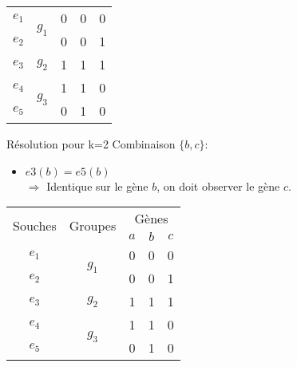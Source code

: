 \begin{overprint}
{\begin{minipage}[l]{0.46\linewidth}
\begin{center}
\begin{tabular}{|c||c|c|c|c|}
						\hline
						\hline
						$e_1$&\multirow{2}{*}{$g_1$}& 0 & 0 & 0\\
						\cline{1-1} \cline{3-5}
						$e_2$&& 0 & 0 & 1\\
						\hline
						\hline
						$e_3$&$g_2$& 1 & \cellcolor{cyan}1 & 1\\
						\hline
						\hline
						$e_4$&\multirow{2}{*}{$g_3$}& 1 & 1 & 0\\
						\cline{1-1} \cline{3-5}
						$e_5$&& 0 & \cellcolor{cyan}1 & 0\\
						\hline
					\end{tabular}
				\end{center}
			\end{minipage}
			\hspace{0.6cm}
			\begin{minipage}[r]{0.46\linewidth}
				\begin{block}{Résolution pour k=2}
					Combinaison $\{b,c\}$:
					\begin{itemize}
						\item $e3(b) = e5(b) $ \\ $\Rightarrow$ Identique sur le gène $b$, on doit observer le gène $c$.
					\end{itemize}
				\end{block}
			\end{minipage}
		}
		{
			\begin{minipage}[l]{0.46\linewidth}
				\begin{center}
					\begin{tabular}{|c||c|c|c|c|}
						\hline
						\multirow{2}{*}{Souches}&\multirow{2}{*}{Groupes}&\multicolumn{3}{c|}{Gènes
						}\\
						&&$a$&\cellcolor{blue!75}$b$&\cellcolor{blue!75}$c$\\
						\hline
						\hline
						$e_1$&\multirow{2}{*}{$g_1$}& 0 & 0 & 0\\
						\cline{1-1} \cline{3-5}
						$e_2$&& 0 & 0 & 1\\
						\hline
						\hline
						$e_3$&$g_2$& 1 & 1 & \cellcolor{cyan}1\\
						\hline
						\hline
						$e_4$&\multirow{2}{*}{$g_3$}& 1 & 1 & 0\\
						\cline{1-1} \cline{3-5}
						$e_5$&& 0 & 1 & \cellcolor{cyan}0\\
						\hline
					\end{tabular}
				\end{center}
			\end{minipage}
}
\end{overprint}
